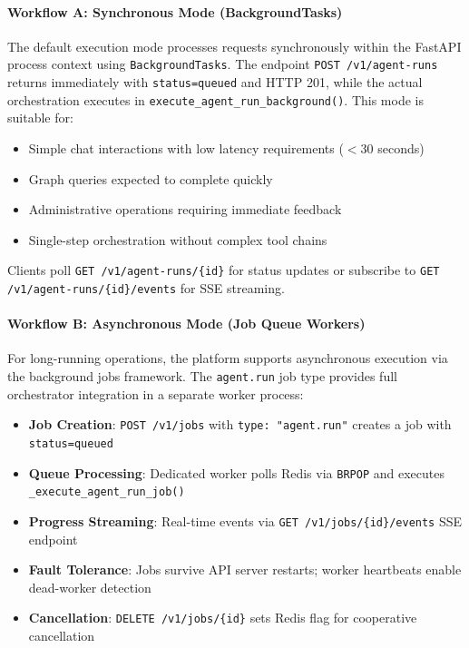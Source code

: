 \documentclass[a4paper,twoside]{sapthesis}
\begin{document}
\paragraph{Workflow A: Synchronous Mode (BackgroundTasks)} The default execution mode processes requests synchronously within the FastAPI process context using \texttt{BackgroundTasks}. The endpoint \texttt{POST /v1/agent-runs} returns immediately with \texttt{status=queued} and HTTP 201, while the actual orchestration executes in \texttt{execute\_agent\_run\_background()}. This mode is suitable for:
\begin{itemize}
    \item Simple chat interactions with low latency requirements ($<$30 seconds)
    \item Graph queries expected to complete quickly
    \item Administrative operations requiring immediate feedback
    \item Single-step orchestration without complex tool chains
\end{itemize}

Clients poll \texttt{GET /v1/agent-runs/\{id\}} for status updates or subscribe to \texttt{GET /v1/agent-runs/\{id\}/events} for SSE streaming.

\paragraph{Workflow B: Asynchronous Mode (Job Queue Workers)}
\label{subsubsec:workflow-b}
For long-running operations, the platform supports asynchronous execution via the background jobs framework. The \texttt{agent.run} job type provides full orchestrator integration in a separate worker process:
\begin{itemize}
    \item \textbf{Job Creation}: \texttt{POST /v1/jobs} with \texttt{type: "agent.run"} creates a job with \texttt{status=queued}
    \item \textbf{Queue Processing}: Dedicated worker polls Redis via \texttt{BRPOP} and executes \texttt{\_execute\_agent\_run\_job()}
    \item \textbf{Progress Streaming}: Real-time events via \texttt{GET /v1/jobs/\{id\}/events} SSE endpoint
    \item \textbf{Fault Tolerance}: Jobs survive API server restarts; worker heartbeats enable dead-worker detection
    \item \textbf{Cancellation}: \texttt{DELETE /v1/jobs/\{id\}} sets Redis flag for cooperative cancellation
\end{itemize}
\end{document}
